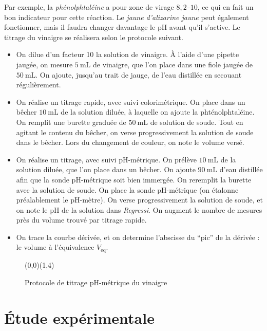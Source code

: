 \documentclass[a4paper,twocolumn,10pt,margin=0.5in]{extreport}
\begin{document}
	Par exemple, la \textit{phénolphtaléine} a pour zone de virage $8{,}2$--$10$, ce qui en fait un bon indicateur pour cette réaction.
	Le \textit{jaune d’alizarine jaune} peut également fonctionner, mais il faudra changer davantage le $\mathrm{pH}$\/ avant qu'il s'active.
	Le titrage du vinaigre se réalisera selon le protocole suivant.
	\begin{itemize}
		\item On dilue d'un facteur 10 la solution de vinaigre. À l'aide d'une pipette jaugée, on mesure $5\:\mathrm{mL}$\/ de vinaigre, que l'on place dans une fiole jaugée de $50\:\mathrm{mL}$. On ajoute, jusqu'au trait de jauge, de l'eau distillée en secouant régulièrement.
		\item On réalise un titrage rapide, avec suivi colorimétrique. On place dans un bêcher $10\:\mathrm{mL}$ de la solution diluée, à laquelle on ajoute la phténolphtaléine. On remplit une burette graduée de $50\:\mathrm{mL}$\/ de solution de soude. Tout en agitant le contenu du bêcher, on verse progressivement la solution de soude dans le bêcher. Lors du changement de couleur, on note le volume versé.
		\item On réalise un titrage, avec suivi $\mathrm{pH}$-métrique.
			On prélève $10\:\mathrm{mL}$\/ de la solution diluée, que l'on place dans un bêcher.
			On ajoute $90\:\mathrm{mL}$ d'eau distillée afin que la sonde $\mathrm{pH}$-métrique soit bien immergée.
			On reremplit la burette avec la solution de soude.
			On place la sonde $\mathrm{pH}$-métrique (on étalonne préalablement le $\mathrm{pH}$-mètre). On verse progressivement la solution de soude, et on note le $\mathrm{pH}$\/ de la solution dans \textit{Regressi}. On augment le nombre de mesures près du volume trouvé par titrage rapide.
		\item On trace la courbe dérivée, et on determine l'abscisse du ``pic'' de la dérivée : le volume à l'équivalence $V_\mathrm{\acute{e}q}$.
	\end{itemize}


	\begin{figure}[H]
		\centering
			\begin{pspicture}(0,0)(1,4)
				\pstDosage[phmetre,couleurReactifBurette=red]
			\end{pspicture}
		\caption{Protocole de titrage $\mathrm{pH}$-métrique du vinaigre}
	\end{figure}

	\section{Étude expérimentale}
\end{document}
